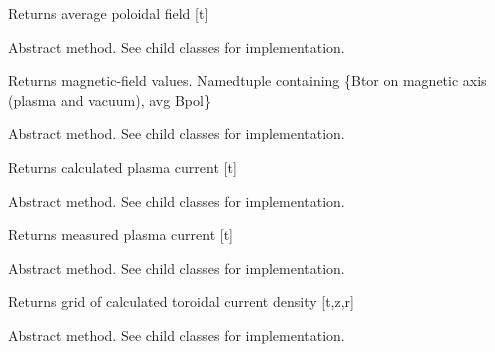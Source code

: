 \documentclass[letterpaper,10pt,english]{sphinxmanual}
\begin{document}
\begin{fulllineitems}
\begin{fulllineitems}
Returns average poloidal field {[}t{]}

\end{fulllineitems}


\begin{fulllineitems}
\label{eqtools:eqtools.core.Equilibrium.getFields}
Abstract method.  See child classes for implementation.

Returns magnetic-field values.
Namedtuple containing \{Btor on magnetic axis (plasma and vacuum), avg Bpol\}

\end{fulllineitems}


\begin{fulllineitems}
\label{eqtools:eqtools.core.Equilibrium.getIpCalc}
Abstract method.  See child classes for implementation.

Returns calculated plasma current {[}t{]}

\end{fulllineitems}


\begin{fulllineitems}
\label{eqtools:eqtools.core.Equilibrium.getIpMeas}
Abstract method.  See child classes for implementation.

Returns measured plasma current {[}t{]}

\end{fulllineitems}


\begin{fulllineitems}
\label{eqtools:eqtools.core.Equilibrium.getJp}
Abstract method.  See child classes for implementation.

Returns grid of calculated toroidal current density {[}t,z,r{]}

\end{fulllineitems}


\begin{fulllineitems}
\label{eqtools:eqtools.core.Equilibrium.getBetaT}
Abstract method.  See child classes for implementation.


\end{fulllineitems}
\end{fulllineitems}
\end{document}
